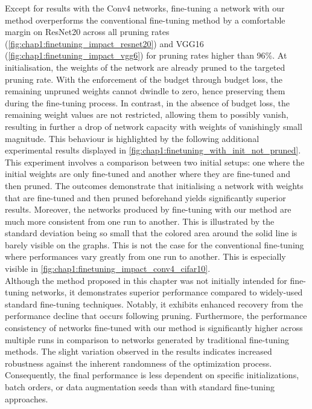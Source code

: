 Except for results with the Conv4 networks, fine-tuning a network with our
method overperforms the conventional fine-tuning method by a comfortable margin
on ResNet20 across all pruning rates
(\cref{fig:chap1:finetuning_impact_resnet20}) and VGG16
(\cref{fig:chap1:finetuning_impact_vgg6}) for pruning rates higher than 96\%. At
initialisation, the weights of the network are already pruned to the targeted
pruning rate. With the enforcement of the budget through budget loss, the
remaining unpruned weights cannot dwindle to zero, hence preserving them during
the fine-tuning process. In contrast, in the absence of budget loss, the
remaining weight values are not restricted, allowing them to possibly vanish,
resulting in further a drop of network capacity with weights of vanishingly
small magnitude. This behaviour is highlighted by the following additional
experimental results displayed in
\cref{fig:chap1:finetuning_with_init_not_pruned}. This experiment involves a
comparison between two initial setups: one where the initial weights are only
fine-tuned and another where they are fine-tuned and then pruned. The outcomes
demonstrate that initialising a network with weights that are fine-tuned and
then pruned beforehand yields significantly superior results. Moreover, the
networks produced by fine-tuning with our method are much more consistent from
one run to another. This is illustrated by the standard deviation being so small
that the colored area around the solid line is barely visible on the graphs.
This is not the case for the conventional fine-tuning where performances vary
greatly from one run to another. This is especially visible in
\cref{fig:chap1:finetuning_impact_conv4_cifar10}.\\

Although the method proposed in this chapter was not initially intended for
fine-tuning networks, it demonstrates superior performance compared to
widely-used standard fine-tuning techniques. Notably, it exhibits enhanced
recovery from the performance decline that occurs following pruning.
Furthermore, the performance consistency of networks fine-tuned with our method
is significantly higher across multiple runs in comparison to networks generated
by traditional fine-tuning methods. The slight variation observed in the results
indicates increased robustness against the inherent randomness of the
optimization process. Consequently, the final performance is less dependent on
specific initializations, batch orders, or data augmentation seeds than with
standard fine-tuning approaches.\\

